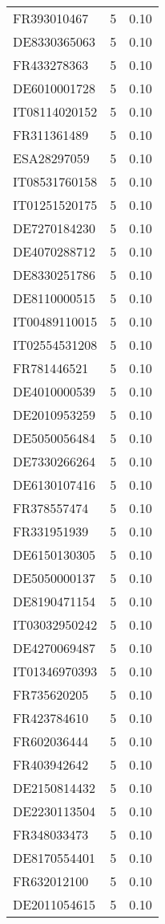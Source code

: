 \begin{table*}[htbp]
\begin{tabular}{lrr}
FR393010467 & 5 & 0.10 \\
DE8330365063 & 5 & 0.10 \\
FR433278363 & 5 & 0.10 \\
DE6010001728 & 5 & 0.10 \\
IT08114020152 & 5 & 0.10 \\
FR311361489 & 5 & 0.10 \\
ESA28297059 & 5 & 0.10 \\
IT08531760158 & 5 & 0.10 \\
IT01251520175 & 5 & 0.10 \\
DE7270184230 & 5 & 0.10 \\
DE4070288712 & 5 & 0.10 \\
DE8330251786 & 5 & 0.10 \\
DE8110000515 & 5 & 0.10 \\
IT00489110015 & 5 & 0.10 \\
IT02554531208 & 5 & 0.10 \\
FR781446521 & 5 & 0.10 \\
DE4010000539 & 5 & 0.10 \\
DE2010953259 & 5 & 0.10 \\
DE5050056484 & 5 & 0.10 \\
DE7330266264 & 5 & 0.10 \\
DE6130107416 & 5 & 0.10 \\
FR378557474 & 5 & 0.10 \\
FR331951939 & 5 & 0.10 \\
DE6150130305 & 5 & 0.10 \\
DE5050000137 & 5 & 0.10 \\
DE8190471154 & 5 & 0.10 \\
IT03032950242 & 5 & 0.10 \\
DE4270069487 & 5 & 0.10 \\
IT01346970393 & 5 & 0.10 \\
FR735620205 & 5 & 0.10 \\
FR423784610 & 5 & 0.10 \\
FR602036444 & 5 & 0.10 \\
FR403942642 & 5 & 0.10 \\
DE2150814432 & 5 & 0.10 \\
DE2230113504 & 5 & 0.10 \\
FR348033473 & 5 & 0.10 \\
DE8170554401 & 5 & 0.10 \\
FR632012100 & 5 & 0.10 \\
DE2011054615 & 5 & 0.10 \\

\end{tabular}
\end{table*}
